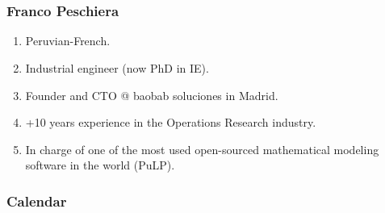 \section[Context and SoA]{\introtitle}

\begin{frame}
\frametitle{\textbf{Franco Peschiera}}

\begin{enumerate}[<+->]
  \item Peruvian-French.
  \item Industrial engineer (now PhD in IE).
  \item Founder and CTO @ baobab soluciones in Madrid.  
  \item +10 years experience in the Operations Research industry.
  \item In charge of one of the most used open-sourced mathematical modeling software in the world (PuLP).
\end{enumerate}


\end{frame}

\begin{frame}
\frametitle{\textbf{Calendar}}

    


\end{frame}




